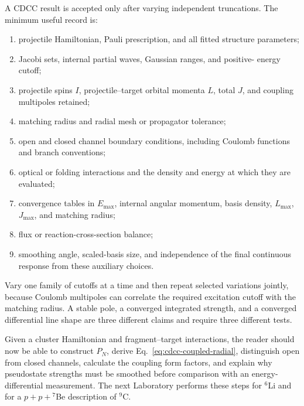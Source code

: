 A CDCC result is accepted only after varying independent truncations.  The
minimum useful record is:
\begin{enumerate}[label=\arabic*.]
  \item projectile Hamiltonian, Pauli prescription, and all fitted structure
  parameters;
  \item Jacobi sets, internal partial waves, Gaussian ranges, and positive-
  energy cutoff;
  \item projectile spins $I$, projectile--target orbital momenta $L$, total
  $J$, and coupling multipoles retained;
  \item matching radius and radial mesh or propagator tolerance;
  \item open and closed channel boundary conditions, including Coulomb
  functions and branch conventions;
  \item optical or folding interactions and the density and energy at which
  they are evaluated;
  \item convergence tables in $E_{\max}$, internal angular momentum, basis
  density, $L_{\max}$, $J_{\max}$, and matching radius;
  \item flux or reaction-cross-section balance;
  \item smoothing angle, scaled-basis size, and independence of the final
  continuous response from these auxiliary choices.
\end{enumerate}
Vary one family of cutoffs at a time and then repeat selected variations
jointly, because Coulomb multipoles can correlate the required excitation
cutoff with the matching radius.  A stable pole, a converged integrated
strength, and a converged differential line shape are three different claims
and require three different tests.

\begin{checkpointbox}
Given a cluster Hamiltonian and fragment--target interactions, the reader
should now be able to construct $P_N$, derive
Eq.~\eqref{eq:cdcc-coupled-radial}, distinguish open from closed channels,
calculate the coupling form factors, and explain why pseudostate strengths
must be smoothed before comparison with an energy-differential measurement.
The next Laboratory performs these steps for $^6$Li and for a
$p+p+{}^7$Be description of $^9$C.
\end{checkpointbox}
